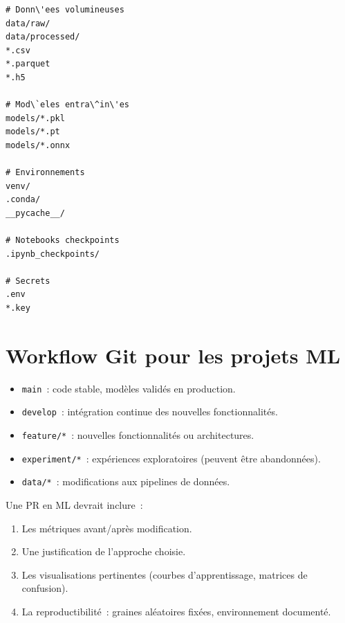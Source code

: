 \begin{codeblock}[title=\textbf{Exemple de \file{.gitignore} pour un projet ML}]
\begin{verbatim}
# Donn\'ees volumineuses
data/raw/
data/processed/
*.csv
*.parquet
*.h5

# Mod\`eles entra\^in\'es
models/*.pkl
models/*.pt
models/*.onnx

# Environnements
venv/
.conda/
__pycache__/

# Notebooks checkpoints
.ipynb_checkpoints/

# Secrets
.env
*.key
\end{verbatim}
\end{codeblock}

\section{Workflow Git pour les projets ML}
\label{sec:git-workflow-ml}


\begin{bonnepratique}[title=\textbf{Strat\'egie de branches pour le ML}]
\begin{itemize}
  \item \texttt{main}~: code stable, mod\`eles valid\'es en production.
  \item \texttt{develop}~: int\'egration continue des nouvelles fonctionnalit\'es.
  \item \texttt{feature/*}~: nouvelles fonctionnalit\'es ou architectures.
  \item \texttt{experiment/*}~: exp\'eriences exploratoires (peuvent \^etre abandonn\'ees).
  \item \texttt{data/*}~: modifications aux pipelines de donn\'ees.
\end{itemize}
\end{bonnepratique}

\begin{bonnepratique}[title=\textbf{Revues de code (Pull Requests) en ML}]
Une PR en ML devrait inclure~:
\begin{enumerate}
  \item Les m\'etriques avant/apr\`es modification.
  \item Une justification de l'approche choisie.
  \item Les visualisations pertinentes (courbes d'apprentissage, matrices de confusion).
  \item La reproductibilit\'e~: graines al\'eatoires fix\'ees, environnement document\'e.
\end{enumerate}
\end{bonnepratique}

